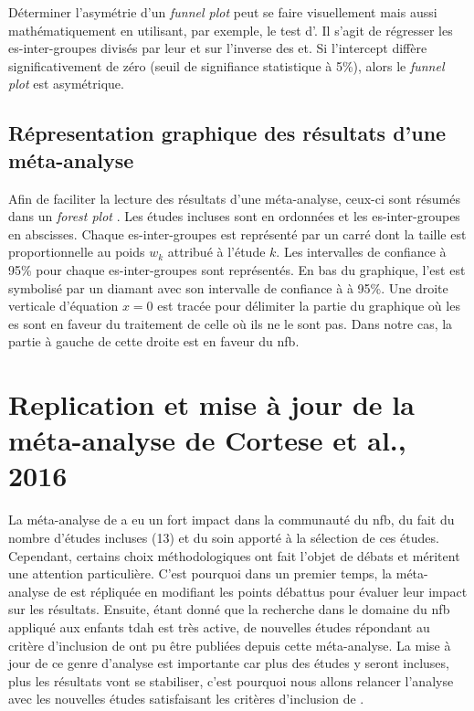 Déterminer l'asymétrie d'un \textit{funnel plot} peut se faire visuellement mais aussi mathématiquement en utilisant, par exemple, le test d'\citet{Egger1997}. 
Il s'agit de régresser les \gls{es}-inter-groupes divisés par leur \gls{et} sur l'inverse des \gls{et}. Si l'intercept diffère significativement de 
zéro (seuil de signifiance statistique à 5\%), alors le \textit{funnel plot} est asymétrique.

\subsection{Répresentation graphique des résultats d'une méta-analyse}

Afin de faciliter la lecture des résultats d'une méta-analyse, ceux-ci sont résumés dans un \textit{forest plot} \citep{Borenstein2009}. Les études incluses sont
en ordonnées et les \gls{es}-inter-groupes en abscisses. Chaque \gls{es}-inter-groupes est représenté par un carré dont la taille est proportionnelle
au poids $w_k$ attribué à l'étude $k$. Les intervalles de confiance à 95\% pour chaque \gls{es}-inter-groupes sont représentés. En bas du graphique, l'\gls{est}
est symbolisé par un diamant avec son intervalle de confiance à à 95\%. Une droite verticale d'équation $x = 0$ est tracée pour délimiter la
partie du graphique où les \gls{es} sont en faveur du traitement de celle où ils ne le sont pas. Dans notre cas, la partie à gauche de cette droite
est en faveur du \gls{nfb}.

\section{Replication et mise à jour de la méta-analyse de Cortese et al., 2016} 

La méta-analyse de \citet{Cortese2016} a eu un fort impact dans la communauté du \gls{nfb}, du fait du nombre d'études incluses (13) et 
du soin apporté à la sélection de ces études. Cependant, certains choix méthodologiques ont fait l'objet de débats \citep{Micoulaud2016} et
méritent une attention particulière.
C'est pourquoi dans un premier temps, la méta-analyse de \citet{Cortese2016} est répliquée en modifiant les points débattus pour évaluer leur impact sur les
résultats. Ensuite, étant donné que la recherche dans le domaine du \gls{nfb} appliqué aux enfants \gls{tdah} est très active, de nouvelles études répondant au 
critère d'inclusion de \citet{Cortese2016} ont pu être publiées depuis cette méta-analyse. La mise à jour de ce genre d'analyse est importante
car plus des études y seront incluses, plus les résultats vont se stabiliser, c'est pourquoi nous allons relancer l'analyse avec les nouvelles études
satisfaisant les critères d'inclusion de \citet{Cortese2016}.

